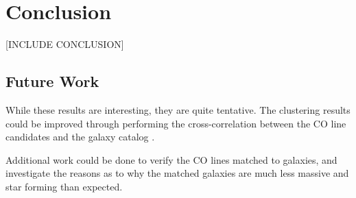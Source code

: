 \documentclass[twoside,single]{lion-msc}
\begin{document}




\chapter{Conclusion}

[INCLUDE CONCLUSION]

\section{Future Work}

While these results are interesting, they are quite tentative. The clustering results could be improved through performing the cross-correlation between the CO line candidates and the galaxy catalog \cite{hickox2011clustering, 10.1111/j.1365-2966.2011.20303.x, 10.1111/j.1365-2966.2008.14071.x}. 

Additional work could be done to verify the CO lines matched to galaxies, and investigate the reasons as to why the matched galaxies are much less massive and star forming than expected.

\appendix
%



\end{document}
